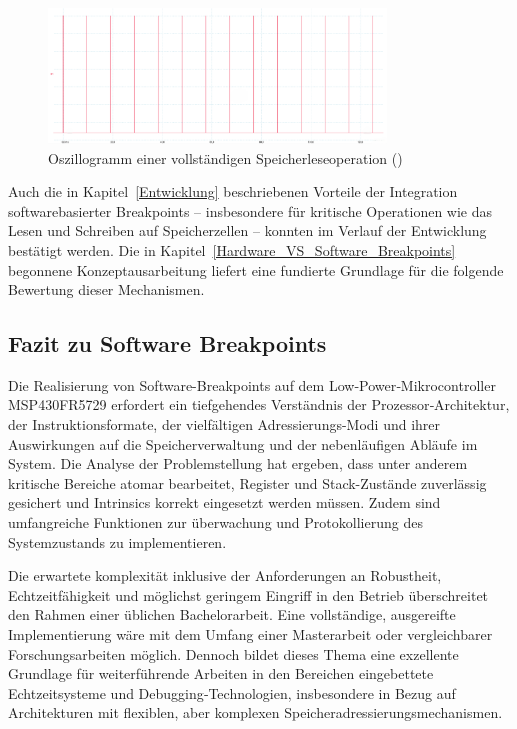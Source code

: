 \begin{figure}[h!]
	\centering
	\includegraphics[width=0.8\textwidth]{../Bilder/BA_MSP430_Observer_Zeitmessungen/ReadMem_Complete_zoomed_rdm_0x1C00_13.png}
	\caption{Oszillogramm einer vollst\"andigen Speicherleseoperation ()}
	\label{fig:zeichenorientiertes_lesen}
\end{figure}

Auch die in Kapitel~\ref{Entwicklung} beschriebenen Vorteile der Integration softwarebasierter Breakpoints -- insbesondere f\"ur kritische Operationen wie das Lesen und Schreiben auf Speicherzellen -- konnten im Verlauf der Entwicklung best\"atigt werden. Die in Kapitel~\ref{Hardware_VS_Software_Breakpoints} begonnene Konzeptausarbeitung liefert eine fundierte Grundlage f\"ur die folgende Bewertung dieser Mechanismen.


\subsection{Fazit zu Software Breakpoints}
\label{sec:FazitSoftwareBreakpoints}

Die Realisierung von Software-Breakpoints auf dem Low‑Power‑Mikrocontroller MSP430FR5729 erfordert ein tiefgehendes Verst\"andnis der Prozessor‑Architektur, der Instruktionsformate, der vielf\"altigen Adressierungs-Modi und ihrer Auswirkungen auf die Speicherverwaltung und der nebenl\"aufigen Abl\"aufe im System. Die Analyse der Problemstellung hat ergeben, dass unter anderem kritische Bereiche atomar bearbeitet, Register und Stack-Zust\"ande zuverl\"assig gesichert und Intrinsics korrekt eingesetzt werden m\"ussen. Zudem sind umfangreiche Funktionen zur \"uberwachung und Protokollierung des Systemzustands zu implementieren.

Die erwartete komplexit\"at inklusive der Anforderungen an Robustheit, Echtzeitf\"ahigkeit und m\"oglichst geringem Eingriff in den Betrieb \"uberschreitet den Rahmen einer \"ublichen Bachelorarbeit. Eine vollst\"andige, ausgereifte Implementierung w\"are mit dem Umfang einer Masterarbeit oder vergleichbarer Forschungsarbeiten m\"oglich. Dennoch bildet dieses Thema eine exzellente Grundlage f\"ur weiterf\"uhrende Arbeiten in den Bereichen eingebettete Echtzeitsysteme und Debugging‑Technologien, insbesondere in Bezug auf Architekturen mit flexiblen, aber komplexen Speicheradressierungsmechanismen.

